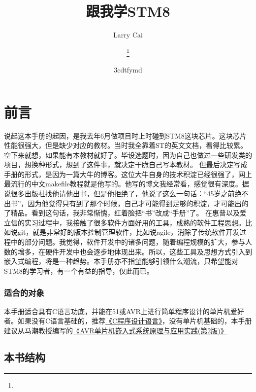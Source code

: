 \documentclass[a4paper]{book}
\title{{跟我学STM8}}
\author{Larry Cai}
\title{\huge{\savedtitle}}
\author{\textbf{\savedauthor}\thanks{}}
\date{\w3cdtfymd}
\begin{document}
\thispagestyle{empty}
\setcounter{tocdepth}{4}

\frontmatter
\chapter*{前言}

说起这本手册的起因，是我去年6月做项目时上时碰到STM8这块芯片。这块芯片性能很强大，但是缺少对应的教材。当时我全靠着ST的英文文档，看得比较累。空下来就想，如果能有本教材就好了。毕设选题时，因为自己也做过一些研发类的项目，想换种形式，想到了这件事，就决定干脆自己写本教材。 但最后决定写成手册的形式，是因为一篇大牛的博客。这位大牛自身的技术积淀已经很强了，网上最流行的中文makefile教程就是他写的。他写的博文我经常看，感觉很有深度。据说很多出版社找他请他出书，但是他拒绝了，他说了这么一句话：“45岁之前绝不出书”，因为他觉得只有到了那个时候，自己才可能得到足够的积淀，才可能出的了精品。看到这句话，我非常惭愧，红着脸把“书”改成“手册”了。 在惠普以及爱立信的实习过程中，我接触了很多软件方面好用的工具，成熟的软件工程思想。比如说git，就是非常好的版本控制管理软件，比如说agile，消除了传统软件开发过程中的部分问题。我觉得，软件开发中的诸多问题，随着编程规模的扩大，参与人数的增多，在硬件开发中也会逐步地体现出来。所以，这些工具及思想方式引入到嵌入式编程，将是一种趋势。本手册亦不指望能够引领什么潮流，只希望能对STM8的学习者，有一个有益的指导，仅此而已。

\subsection*{适合的对象}

本手册适合具有C语言功底，并能在51或AVR上进行简单程序设计的单片机爱好者。如果没有C语言基础的，推荐\href{http://product.china-pub.com/14975\&ref=browse}{《C程序设计语言》}，没有单片机基础的，本手册建议从马潮教授编写的\href{http://www.amazon.cn/AVR\%E5\%8D\%95\%E7\%89\%87\%E6\%9C\%BA\%E5\%B5\%8C\%E5\%85\%A5\%E5\%BC\%8F\%E7\%B3\%BB\%E7\%BB\%9F\%E5\%8E\%9F\%E7\%90\%86\%E4\%B8\%8E\%E5\%BA\%94\%E7\%94\%A8\%E5\%AE\%9E\%E8\%B7\%B5-\%E9\%A9\%AC\%E6\%BD\%AE/dp/B005GZQWB0/ref=sr\_1\_1?ie=UTF8\&qid=1335097650\&sr=8-1}{《AVR单片机嵌入式系统原理与应用实践(第2版)》}

\section*{本书结构}
\end{document}
